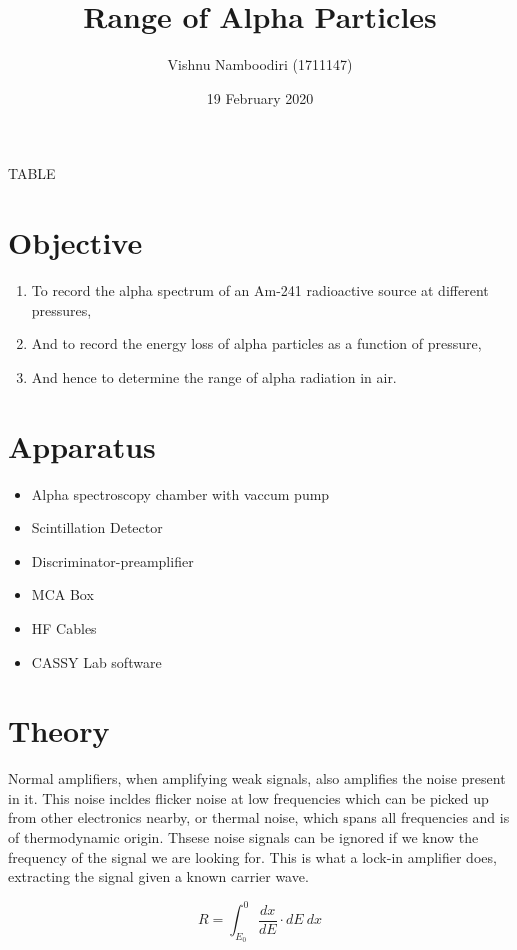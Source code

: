 \documentclass[a4paper]{article}
\title{\textbf{Range of Alpha Particles}}
\author{Vishnu Namboodiri (1711147)}
\date{19 February 2020}
\begin{document}
\maketitle

TABLE


\section*{Objective}

\begin{enumerate}
\item To record the alpha spectrum of an Am-241 radioactive source at different pressures,
\item And to record the energy loss of alpha particles as a function of pressure,
\item And hence to determine the range of alpha radiation in air.
\end{enumerate}



\section*{Apparatus}



\begin{itemize}
\item Alpha spectroscopy chamber with vaccum pump
\item Scintillation Detector
\item Discriminator-preamplifier
\item MCA Box
\item HF Cables
\item CASSY Lab software
\end{itemize}


\section*{Theory}


Normal amplifiers, when amplifying weak signals, also amplifies the noise present in it. This noise incldes flicker noise at low frequencies which can be picked up from other electronics nearby, or thermal noise, which spans all frequencies and is of thermodynamic origin. Thsese noise signals can be ignored if we know the frequency of the signal we are looking for. This is what a lock-in amplifier does, extracting the signal given a known carrier wave.


$$R=\int_{E_0}^{0} \frac{dx}{dE} \cdot dE \ dx$$
\end{document}
